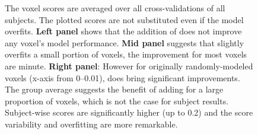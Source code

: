\begin{figure}
    \centering
    \caption[Histogram of  with  Features]{The voxel scores are averaged over all cross-validations of all subjects. The plotted scores are not substituted even if the model overfits. \textbf{Left panel} shows that the addition of  does not improve any voxel's model performance. \textbf{Mid panel} suggests that  slightly overfits a small portion of voxels, the improvement for most voxels are minute. \textbf{Right panel}: However for originally randomly-modeled voxels (x-axis from 0--0.01),  does bring significant improvements. The group average suggests the benefit of adding  for a large proportion of voxels, which is not the case for subject results. Subject-wise scores are significantly higher (up to 0.2) and the score variability and overfitting are more remarkable.} 
    \label{fig:histo_base_best_nonsub_G}
\end{figure}


